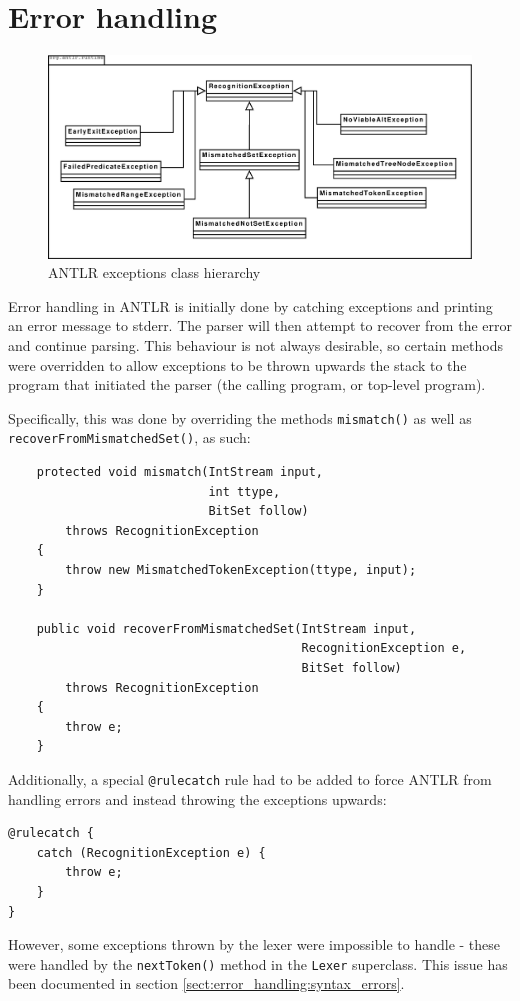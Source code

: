 \section{Error handling}
\label{sec:impl:errorhandling}
\begin{figure}[!h]
  \centering
    \includegraphics[width=1\textwidth]{diagrams/exception_uml}
  \caption{ANTLR exceptions class hierarchy}
\end{figure}
Error handling in ANTLR is initially done by catching exceptions and printing
an error message to stderr. The parser will then attempt to recover from the
error and continue parsing. This behaviour is not always desirable, so certain
methods were overridden to allow exceptions to be thrown upwards the stack to
the program that initiated the parser (the calling program, or top-level
program).

Specifically, this was done by overriding the methods \verb!mismatch()! as well as
\verb!recoverFromMismatchedSet()!, as such:

\begin{Verbatim}
    protected void mismatch(IntStream input, 
                            int ttype, 
                            BitSet follow)
        throws RecognitionException
    {
        throw new MismatchedTokenException(ttype, input);
    }

    public void recoverFromMismatchedSet(IntStream input, 
                                         RecognitionException e, 
                                         BitSet follow)
        throws RecognitionException
    {
        throw e;
    }
\end{Verbatim}

Additionally, a special \verb!@rulecatch! rule had to be added to force ANTLR from
handling errors and instead throwing the exceptions upwards:

\begin{Verbatim}
@rulecatch {
    catch (RecognitionException e) {
        throw e;
    }
}
\end{Verbatim}

However, some exceptions thrown by the lexer were impossible to handle - these
were handled by the \verb!nextToken()! method in the \verb!Lexer! superclass.
This issue has been documented in section 
\ref{sect:error_handling:syntax_errors}.
